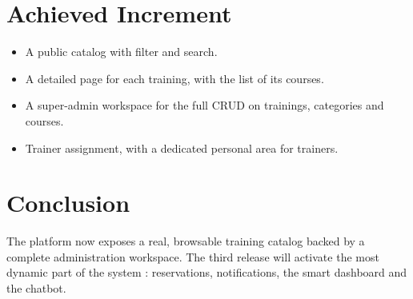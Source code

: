 \section{Achieved Increment}

\begin{itemize}[leftmargin=2em,itemsep=0.2em]
  \item A public catalog with filter and search.
  \item A detailed page for each training, with the list of its courses.
  \item A super-admin workspace for the full CRUD on trainings, categories and courses.
  \item Trainer assignment, with a dedicated personal area for trainers.
\end{itemize}

\section{Conclusion}

The platform now exposes a real, browsable training catalog backed by a complete administration workspace. The third release will activate the most dynamic part of the system : reservations, notifications, the smart dashboard and the chatbot.
